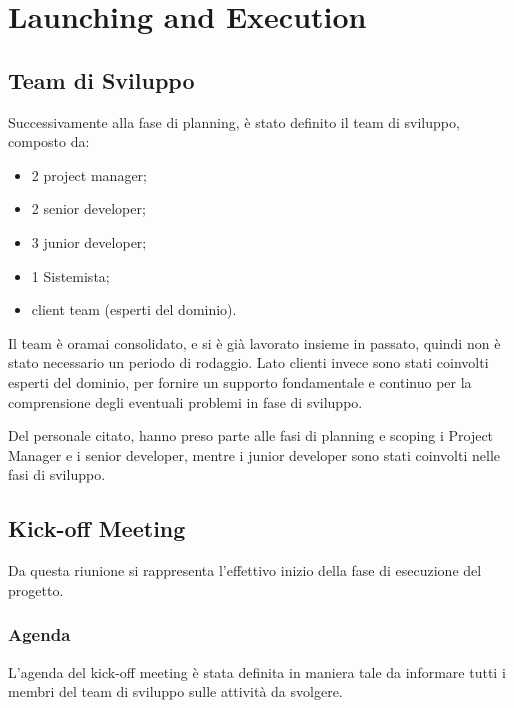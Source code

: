 \section{Launching and Execution}

\subsection{Team di Sviluppo}
Successivamente alla fase di planning, è stato definito il team di sviluppo, composto da:
\begin{itemize}
    \item 2 project manager;
    \item 2 senior developer;
    \item 3 junior developer;
    \item 1 Sistemista;
    \item client team (esperti del dominio).
\end{itemize}

Il team è oramai consolidato, e si è già lavorato insieme in passato, quindi non è stato necessario un periodo di rodaggio.
Lato clienti invece sono stati coinvolti esperti del dominio, per fornire un supporto fondamentale e continuo per la comprensione
degli eventuali problemi in fase di sviluppo.

Del personale citato, hanno preso parte alle fasi di planning e scoping i Project Manager e i senior developer, mentre i junior developer
sono stati coinvolti nelle fasi di sviluppo.

\subsection{Kick-off Meeting}
Da questa riunione si rappresenta l'effettivo inizio della fase di esecuzione del progetto.

\subsubsection{Agenda}
L'agenda del kick-off meeting è stata definita in maniera tale da informare tutti i membri del team di sviluppo sulle attività
da svolgere.

